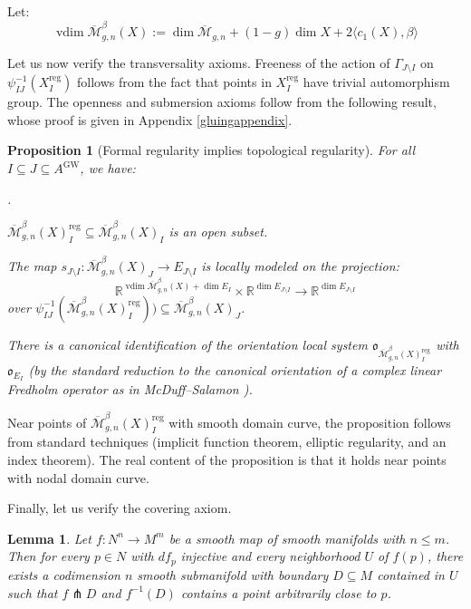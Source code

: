 \documentclass[12pt]{article}
\newtheorem{lemma}[theorem]{Lemma}
\newtheorem{proposition}[theorem]{Proposition}
\theoremstyle{definition}
\theoremstyle{remark}
\numberwithin{equation}{subsection}
\newcommand{\oo}{\mathfrak o}
\newcommand{\RR}{\mathbb R}
\newcommand{\Mbar}{\overline{\mathcal M}}
\newcommand{\vdim}{\operatorname{vdim}}
\newcommand{\GW}{\mathrm{GW}}
\newcommand{\reg}{\mathrm{reg}}
\newcounter{rcounti}
\newenvironment{rlist}{\begin{list}{\roman{rcounti}.}{\usecounter{rcounti}
\setlength\itemsep{0pt}
\setlength\labelsep{4pt}
\setlength\labelwidth{16pt}
\setlength\leftmargin{32pt}
\setlength\listparindent{0pt}
\setlength\parsep{0pt}
\setlength\parskip{0pt}
\setlength\partopsep{0pt}
\setlength\rightmargin{0pt}
\setlength\topsep{0pt}
\setlength\itemindent{0pt}
}}{\end{list}}
\begin{document}
Let:
\begin{equation}
\vdim\Mbar_{g,n}^\beta(X):=\dim\Mbar_{g,n}+(1-g)\dim X+2\langle c_1(X),\beta\rangle
\end{equation}

Let us now verify the transversality axioms.  Freeness of the action of $\Gamma_{J\setminus I}$ on $\psi_{IJ}^{-1}(X_I^\reg)$ follows from the fact that points in $X_I^\reg$ have trivial automorphism group.  The openness and submersion axioms follow from the following result, whose proof is given in Appendix \ref{gluingappendix}.

\begin{proposition}[Formal regularity implies topological regularity]\label{GWgluingneeded}
For all $I\subseteq J\subseteq A^\GW$, we have:
\begin{rlist}
\item\label{GWgluingopen}$\Mbar_{g,n}^\beta(X)^\reg_I\subseteq\Mbar_{g,n}^\beta(X)_I$ is an open subset.
\item\label{GWgluingsubmersion}The map $s_{J\setminus I}:\Mbar_{g,n}^\beta(X)_J\to E_{J\setminus I}$ is locally modeled on the projection:
\begin{equation}
\RR^{\vdim\Mbar_{g,n}^\beta(X)+\dim E_I}\times\RR^{\dim E_{J\setminus I}}\to\RR^{\dim E_{J\setminus I}}
\end{equation}
over $\psi_{IJ}^{-1}(\Mbar_{g,n}^\beta(X)_I^\reg))\subseteq\Mbar_{g,n}^\beta(X)_J$.
\item\label{GWgluingor}There is a canonical identification of the orientation local system $\oo_{\Mbar_{g,n}^\beta(X)_I^\reg}$ with $\oo_{E_I}$ (by the standard reduction to the canonical orientation of a complex linear Fredholm operator as in McDuff--Salamon \cite{mcduffsalamonJholquant,mcduffsalamonJholsymp}).
\end{rlist}
\end{proposition}

Near points of $\Mbar_{g,n}^\beta(X)^\reg_I$ with smooth domain curve, the proposition follows from standard techniques (implicit function theorem, elliptic regularity, and an index theorem).  The real content of the proposition is that it holds near points with nodal domain curve.

Finally, let us verify the covering axiom.

\begin{lemma}\label{sortofsard}
Let $f:N^n\to M^m$ be a smooth map of smooth manifolds with $n\leq m$.  Then for every $p\in N$ with $df_p$ injective and every neighborhood $U$ of $f(p)$, there exists a codimension $n$ smooth submanifold with boundary $D\subseteq M$ contained in $U$ such that $f\pitchfork D$ and $f^{-1}(D)$ contains a point arbitrarily close to $p$.
\end{lemma}
\end{document}

